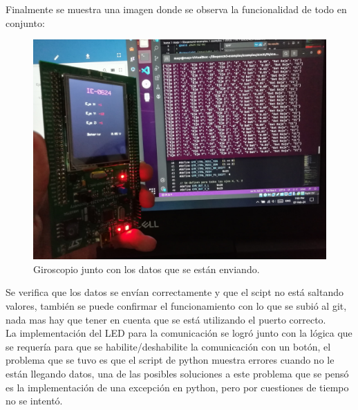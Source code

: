 Finalmente se muestra una imagen donde se observa la funcionalidad de todo en conjunto:
\begin{figure}[H]
    \centering
    \includegraphics[width=.7\linewidth]{Imagenes/k6.jpg}
    \caption{Giroscopio junto con los datos que se están enviando.}
\end{figure}
Se verifica que los datos se envían correctamente y que el scipt no está saltando valores, también se puede confirmar el funcionamiento con lo que se subió al git, nada mas hay que tener en cuenta que se está utilizando el puerto correcto.\\

La implementación del LED para la comunicación se logró junto con la lógica que se requería para que se habilite/deshabilite la comunicación con un botón, el problema que se tuvo es que el script de python muestra errores cuando no le están llegando datos, una de las posibles soluciones a este problema que se pensó es la implementación de una excepción en python, pero por cuestiones de tiempo no se intentó.
\newpage